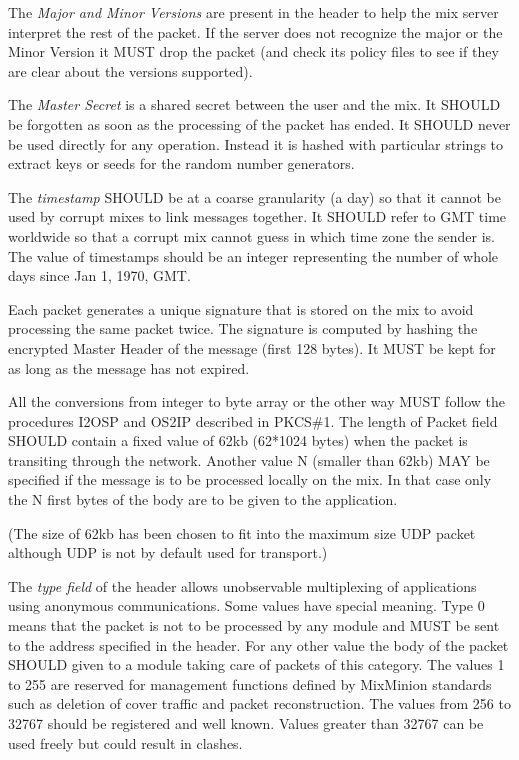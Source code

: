 \documentclass{article}
\begin{document}
The \emph{Major and Minor Versions} are present in the header to help the mix
server interpret the rest of the packet. If the server does not recognize
the major or the Minor Version it MUST drop the packet (and check
its policy files to see if they are clear about the versions supported).

The \emph{Master Secret} is a shared secret between the user and the
mix. It SHOULD be forgotten as soon as the processing of the packet
has ended. It SHOULD never be used directly for any operation. Instead
it is hashed with particular strings to extract keys or seeds for the
random number generators.

The \emph{timestamp} SHOULD be at a coarse granularity (a day) so that
it cannot be used by corrupt mixes to link messages together. It
SHOULD refer to GMT time worldwide so that a corrupt mix cannot guess
in which time zone the sender is. The value of timestamps should be an
integer representing the number of whole days since Jan 1, 1970, GMT.

Each packet generates a unique signature that is stored on the mix to avoid 
processing the same packet twice. The signature is computed by hashing the
encrypted Master Header of the message (first 128 bytes). It MUST be kept for
as long as the message has not expired.

All the conversions from integer to byte array or the other way MUST
follow the procedures I2OSP and OS2IP described in PKCS\#1. The length
of Packet field SHOULD contain a fixed value of 62kb (62*1024 bytes)
when the packet is transiting through the network. Another value N
(smaller than 62kb) MAY be specified if the message is to be processed
locally on the mix. In that case only the N first bytes of the body
are to be given to the application.  

(The size of 62kb has been chosen
to fit into the maximum size UDP packet although UDP is not by default
used for transport.)

% 

The \emph{type field} of the header allows unobservable multiplexing of
applications using anonymous communications. Some values have special
meaning. Type 0 means that the packet is not to be processed by any
module and MUST be sent to the address specified in the header. For
any other value the body of the packet SHOULD given to a module taking
care of packets of this category. The values 1 to 255 are reserved for
management functions defined by MixMinion standards such as deletion
of cover traffic and packet reconstruction. The values from 256 to
32767 should be registered and well known. Values greater than 32767
can be used freely but could result in clashes.
\end{document}
